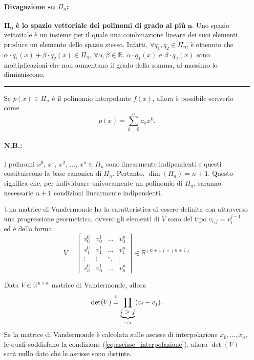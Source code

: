 \paragraph{Divagazione su $\Pi_n$:}{
$\boldsymbol{\Pi_n}$ \textbf{è lo spazio vettoriale dei polinomi di grado al più} $\boldsymbol n$. Uno spazio vettoriale è un insieme per il quale una combinazione lineare dei suoi elementi produce un elemento dello spazio stesso.
Infatti, $\forall q_1, q_2\in\Pi_n$, è ottenuto che $\alpha \cdot q_1(x)+\beta\cdot q_2(x)\in\Pi_n,\, \forall \alpha,\beta\in\mathbb R$. $\alpha \cdot q_1(x)$ e $\beta\cdot q_2(x)$ sono moltiplicazioni che non aumentano il grado della somma, al massimo lo diminuiscono.
\hrule
\vspace{0.3cm}
Se $p(x)\in\Pi_n$ è il polinomio interpolante $f(x)$, allora è possibile scriverlo come
\begin{equation}\label{eq:polinomio_generico}
    p(x)=\sum_{k=0}^{n}a_kx^k.
\end{equation}

\paragraph{N.B.:} I polinomi $x^0,\, x^1,\, x^2,\, \hdots,\, x^n\in\Pi_n$ sono linearmente indipendenti e questi costituiscono la base canonica di $\Pi_n$. Pertanto, $\dim(\Pi_n)=n+1$. Questo significa che, per individuare univocamente un polinomio di $\Pi_n$,  saranno necessarie $n+1$ condizioni linearmente indipendenti.}

 \begin{definition}
	Una matrice di Vandermonde ha la caratteristica di essere definita con attraverso una progressione geormetrica, ovvero gli elementi di $V$ sono del tipo $v_{i,j}=v_i^{j-1}$ ed è della forma
	 \begin{equation*}
	 	V=\begin{bmatrix}
	 		v_0^0 & v_0^1 & \hdots & v_0^n\\
	 		v_1^0 & v_1^1 & \hdots & v_1^n\\
	 		\vdots & \vdots &\ddots & \vdots\\
	 		v_n^0 & v_n^1 & \hdots & v_n^n
	 	\end{bmatrix}\in\mathbb R^{(n+1)\times (n+1)}
	 \end{equation*}
\end{definition}

\begin{property}\label{prop:determinante_matrice_vandermonde}
	Data $V\in\mathbb{R}^{n\times n}$ matrice di Vandermonde, allora
	\begin{equation}\label{eq:determinante_matrice_vandermonde}
		\det(V)\overset{\footnotemark}{=}\prod_{\underbrace{i>j}_{i\neq j}}(v_i-v_j).
	\end{equation}
	Se la matrice di Vandermonde è calcolata sulle ascisse di interpolazione $x_0, \hdots, x_n$, le quali soddisfano la condizione (\ref{eq:ascisse_interpolazione}), allora $\det(V)$ sarà nullo dato che le ascisse sono distinte.
\end{property}

